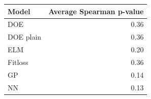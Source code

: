 \begin{tabular}{lr}
\toprule
Model & Average Spearman p-value \\
\midrule
DOE & 0.36 \\
DOE plain & 0.36 \\
ELM & 0.20 \\
Fitloss & 0.36 \\
GP & 0.14 \\
NN & 0.13 \\
\bottomrule
\end{tabular}
